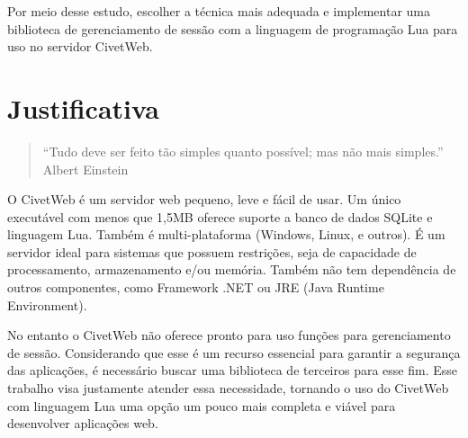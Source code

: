 Por meio desse estudo, escolher a técnica mais adequada e implementar uma biblioteca de gerenciamento de sessão com a linguagem de programação Lua para uso no servidor CivetWeb.


\section{Justificativa}

\begin{quote}
``Tudo deve ser feito tão simples quanto possível; mas não mais simples.''
Albert Einstein
\end{quote}

O CivetWeb é um servidor web pequeno, leve e fácil de usar. Um único executável com menos que 1,5MB oferece suporte a banco de dados SQLite e linguagem Lua. Também é multi-plataforma (Windows, Linux, e outros). É um servidor ideal para sistemas que possuem restrições, seja de capacidade de processamento, armazenamento e/ou memória. Também não tem dependência de outros componentes, como Framework .NET ou JRE (Java Runtime Environment).

No entanto o CivetWeb não oferece pronto para uso funções para gerenciamento de sessão. Considerando que esse é um recurso essencial para garantir a segurança das aplicações, é necessário buscar uma biblioteca de terceiros para esse fim. Esse trabalho visa justamente atender essa necessidade, tornando o uso do CivetWeb com linguagem Lua uma opção um pouco mais completa e viável para desenvolver aplicações web.





